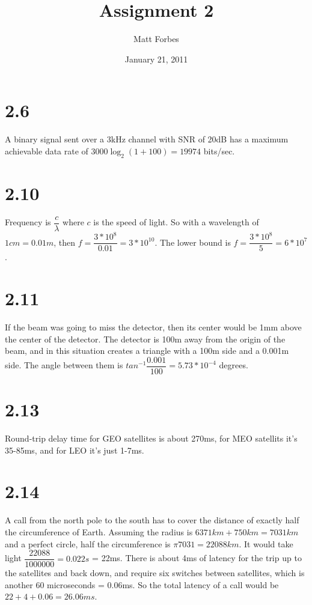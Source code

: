 \documentclass[a4paper,12pt]{article}
\begin{document}
\title{Assignment 2}
\author{Matt Forbes}
\date{January 21, 2011}
\maketitle

\section*{2.6}
A binary signal sent over a 3kHz channel with SNR of 20dB has a
maximum achievable data rate of $3000\log_2(1+100) = 19974$ bits/sec.
\section*{2.10}
Frequency is $\dfrac{c}{\lambda}$ where $c$ is the speed of light. So
with a wavelength of $1cm = 0.01m$, then $f = \dfrac{3*10^8}{0.01} =
3*10^{10}$. The lower bound is $f = \dfrac{3*10^8}{5} = 6*10^7$.
\section*{2.11}
If the beam was going to miss the detector, then its center would be
1mm above the center of the detector. The detector is 100m away from
the origin of the beam, and in this situation creates a triangle with
a 100m side and a 0.001m side. The angle between them is
$tan^{-1}\dfrac{0.001}{100} = 5.73*10^{-4}$ degrees.
\section*{2.13}
Round-trip delay time for GEO satellites is about 270ms, for MEO satellits
it's 35-85ms, and for LEO it's just 1-7ms.
\section*{2.14}
A call from the north pole to the south has to cover the distance of
exactly half the circumference of Earth. Assuming the radius is
$6371km + 750km = 7031km$ and a perfect circle, half the circumference
is $\pi7031 = 22088km$. It would take light $\dfrac{22088}{1000000} =
0.022s$ = 22ms. There is about 4ms of latency for the trip up to the
satellites and back down, and require six switches between satellites,
which is another 60 microseconds = 0.06ms. So the total latency of a
call would be $22 + 4 + 0.06 = 26.06ms$.
\end{document}
